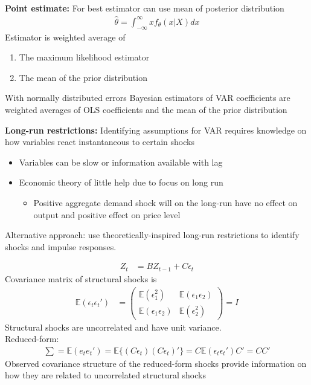 \documentclass{beamer}
\begin{document}
\begin{frame}
  \textbf{Point estimate:} For best estimator can use mean of posterior distribution 
\begin{align}
  \hat{\theta}= \int^\infty_{-\infty} xf_\theta(x | X)dx
\end{align}
 Estimator is weighted average of
 \begin{enumerate}
   \item The maximum likelihood estimator
  \item The mean of the prior distribution
 \end{enumerate}
 With normally distributed errors Bayesian estimators of VAR coefficients are weighted averages of OLS coefficients and the mean of the prior distribution 
\end{frame}

\begin{frame}
  \textbf{Long-run restrictions:} Identifying assumptions for VAR requires knowledge on how variables react instantaneous to certain shocks
  \begin{itemize}
    \item Variables can be slow or information available with lag
    \item Economic theory of little help due to focus on long run
    \begin{itemize}
      \item Positive aggregate demand shock will on the long-run have no effect on output and positive effect on price level
    \end{itemize}
  \end{itemize}
  \medskip
  Alternative approach: use theoretically-inspired long-run restrictions to identify shocks and impulse responses.
\end{frame}

\begin{frame}
  \begin{align}
    Z_t&= BZ_{t-1}+C\epsilon_t    
  \end{align}
  Covariance matrix of structural shocks is
  \begin{align}
    \mathbb{E}(\epsilon_t \epsilon_t') &= \begin{pmatrix} \mathbb{E}(\epsilon_1^2) & \mathbb{E}(\epsilon_1 \epsilon_2) \\ \mathbb{E}(\epsilon_1 \epsilon_2) & \mathbb{E}(\epsilon_2^2) \end{pmatrix} = I
  \end{align}
  \medskip
  Structural shocks are uncorrelated and have unit variance.\\
  Reduced-form:
  \begin{align}
    \sum = \mathbb{E}(e_t e_t') = \mathbb{E} \{(C\epsilon_t) (C\epsilon_t)'\} = C\mathbb{E}(\epsilon_t \epsilon_t')C' = CC'
  \end{align}
  Observed covariance structure of the reduced-form shocks provide information on how they are related to uncorrelated structural shocks
\end{frame}
\end{document}
